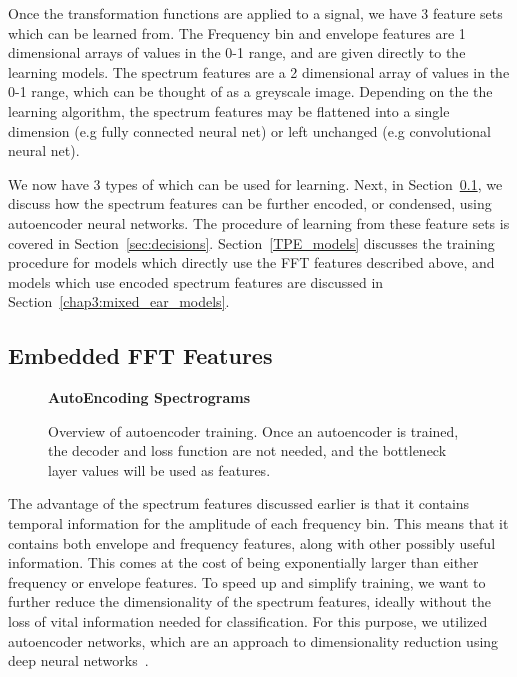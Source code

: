 \documentclass[\main/thesis.tex]{subfiles}
\begin{document}
Once the transformation functions are applied to a signal, we have 3 feature sets which can be learned from. The Frequency bin and envelope features are 1 dimensional arrays of values in the 0-1 range, and are given directly to the learning models. The spectrum features are a 2 dimensional array of values in the 0-1 range, which can be thought of as a greyscale image. Depending on the the learning algorithm, the spectrum features may be flattened into a single dimension (e.g fully connected neural net) or left unchanged (e.g convolutional neural net). 

We now have 3 types of which can be used for learning. Next, in Section~\ref{section:embedded_feats}, we discuss how the spectrum features can be further encoded, or condensed, using autoencoder neural networks. The procedure of learning from these feature sets is covered in Section~\ref{sec:decisions}. Section~\ref{TPE_models} discusses the training procedure for models which directly use the FFT features described above, and models which use encoded spectrum features are discussed in Section~\ref{chap3:mixed_ear_models}.

\subsection{Embedded FFT Features}
\label{section:embedded_feats}
\begin{figure}[t!]
    \begin{center}
    \textbf{AutoEncoding Spectrograms}
    \end{center}
    \caption{Overview of autoencoder training. Once an autoencoder is trained, the decoder and loss function are not needed, and the bottleneck layer values will be used as features. }
\label{fig:autoencoder}
\end{figure}

% 
The advantage of the spectrum features discussed earlier is that it contains temporal information for the amplitude of each frequency bin. This means that it contains both envelope and frequency features, along with other possibly useful information. This comes at the cost of being exponentially larger than either frequency or envelope features. To speed up and simplify training, we want to further reduce the dimensionality of the spectrum features, ideally without the loss of vital information needed for classification. For this purpose, we utilized autoencoder networks, which are an approach to dimensionality reduction using deep neural networks~\cite{hinton1994autoencoders,hinton2006reducing}. 
\end{document}
